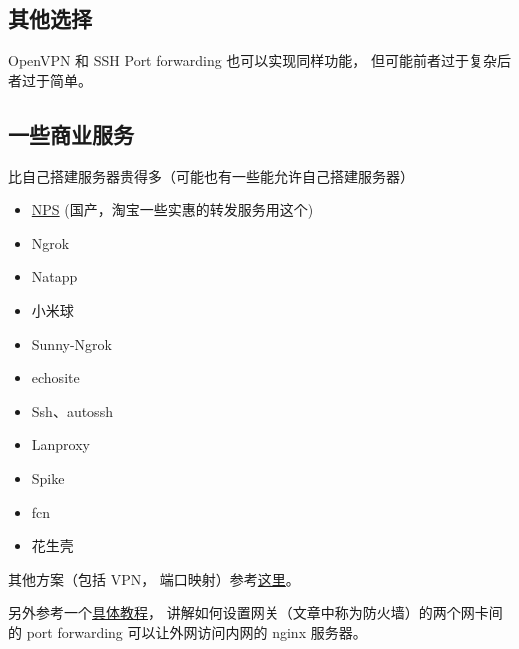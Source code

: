 \subsection{其他选择}
OpenVPN 和 SSH Port forwarding 也可以实现同样功能， 但可能前者过于复杂后者过于简单。

\subsection{一些商业服务}
比自己搭建服务器贵得多（可能也有一些能允许自己搭建服务器）
\begin{itemize}
\item \href{https://github.com/ehang-io/nps}{NPS} (国产，淘宝一些实惠的转发服务用这个)
\item Ngrok
\item Natapp
\item 小米球
\item Sunny-Ngrok
\item echosite
\item Ssh、autossh
\item Lanproxy
\item Spike
\item fcn
\item 花生壳
\end{itemize}

其他方案（包括 VPN， 端口映射）参考\href{https://johackim.com/how-to-expose-local-server-behind-firewall}{这里}。

另外参考一个\href{https://www.digitalocean.com/community/tutorials/how-to-forward-ports-through-a-linux-gateway-with-iptables}{具体教程}， 讲解如何设置网关（文章中称为防火墙）的两个网卡间的 port forwarding 可以让外网访问内网的 nginx 服务器。 
